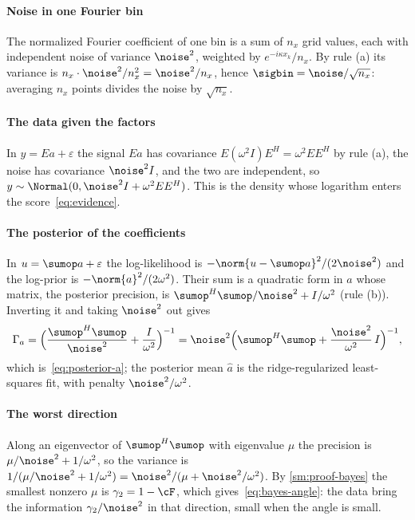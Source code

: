 \paragraph{Noise in one Fourier bin} The normalized Fourier coefficient of one bin is a sum of $n_x$ grid values, each
with independent noise of variance $\noise^2$, weighted by $e^{-i\kappa x_k}/n_x$. By rule (a) its variance is
$n_x\cdot\noise^2/n_x^2=\noise^2/n_x$, hence $\sigbin=\noise/\sqrt{n_x}$: averaging $n_x$ points divides the noise by
$\sqrt{n_x}$.

\paragraph{The data given the factors} In $y=Ea+\varepsilon$ the signal $Ea$ has covariance $E(\omega^2I)E^H=\omega^2EE^H$ by
rule (a), the noise has covariance $\noise^2I$, and the two are independent, so $y\sim\Normal(0,\noise^2I+\omega^2EE^H)$. This
is the density whose logarithm enters the score~\eqref{eq:evidence}.

\paragraph{The posterior of the coefficients} In $u=\sumop a+\varepsilon$ the log-likelihood is
$-\norm{u-\sumop a}^2/(2\noise^2)$ and the log-prior is $-\norm{a}^2/(2\omega^2)$. Their sum is a quadratic form in $a$ whose
matrix, the posterior precision, is $\sumop^H\sumop/\noise^2+I/\omega^2$ (rule (b)). Inverting it and taking $\noise^2$ out gives
\[
  \Gamma_a=\Big(\frac{\sumop^H\sumop}{\noise^2}+\frac{I}{\omega^2}\Big)^{-1}=\noise^2\Big(\sumop^H\sumop+\frac{\noise^2}{\omega^2}\,I\Big)^{-1},
\]
which is~\eqref{eq:posterior-a}; the posterior mean $\hat a$ is the ridge-regularized least-squares fit, with
penalty $\noise^2/\omega^2$.

\paragraph{The worst direction} Along an eigenvector of $\sumop^H\sumop$ with eigenvalue $\mu$ the precision is
$\mu/\noise^2+1/\omega^2$, so the variance is $1/(\mu/\noise^2+1/\omega^2)=\noise^2/(\mu+\noise^2/\omega^2)$. By
\cref{sm:proof-bayes} the smallest nonzero $\mu$ is $\gamma_2=1-\cF$, which gives~\eqref{eq:bayes-angle}: the data bring
the information $\gamma_2/\noise^2$ in that direction, small when the angle is small.


